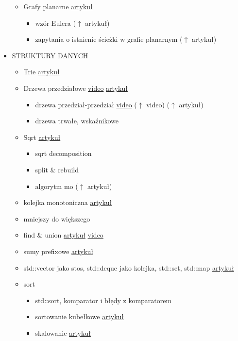\documentclass[15pt]{article}
\begin{document}
\begin{itemize}
\begin{itemize}
        \item Grafy planarne \href{http://kompendium.meetit.pl/kurs#graphD}{artykuł}
        \begin{itemize}
            \item wzór Eulera ($\uparrow$ artykuł)
            \item zapytania o istnienie ścieżki w grafie planarnym ($\uparrow$ artykuł)
        \end{itemize}
    \end{itemize}
    
    \item STRUKTURY DANYCH
    \begin{itemize}
        \item Trie \href{http://kompendium.meetit.pl/kurs#text4}{artykuł}
        \item Drzewa przedziałowe \href{http://solve.edu.pl/~sparingi/resources}{video} \href{http://kompendium.meetit.pl/kurs#struct2}{artykuł}
        \begin{itemize}
            \item drzewa przedział-przedział \href{http://was.zaa.mimuw.edu.pl/?q=node/8}{video} ($\uparrow$ video) ($\uparrow$ artykuł)
            \item drzewa trwałe, wskaźnikowe
        \end{itemize}
        \item Sqrt \href{http://kompendium.meetit.pl/kurs#struct4}{artykuł}
        \begin{itemize}
            \item sqrt decomposition
            \item split \& rebuild
            \item algorytm mo ($\uparrow$ artykuł)
        \end{itemize}
        \item kolejka monotoniczna \href{http://kompendium.meetit.pl/kurs#struct3}{artykuł}
        \item mniejszy do większego
        \item find \& union \href{http://kompendium.meetit.pl/kurs#struct5}{artykuł} \href{http://solve.edu.pl/~sparingi/resources}{video}
        \item sumy prefixowe \href{http://kompendium.meetit.pl/kurs#basic1}{artykuł}
        \item std::vector jako stos, std::deque jako kolejka, std::set, std::map \href{http://kompendium.meetit.pl/kurs#basic7}{artykuł}
        \item sort
        \begin{itemize}
            \item std::sort, komparator i błędy z komparatorem
            \item sortowanie kubełkowe \href{http://kompendium.meetit.pl/kurs#basic5}{artykuł}
            \item skalowanie \href{http://kompendium.meetit.pl/kurs#basic6}{artykuł}
        \end{itemize}
    \end{itemize}
    

\end{itemize}
\end{document}
